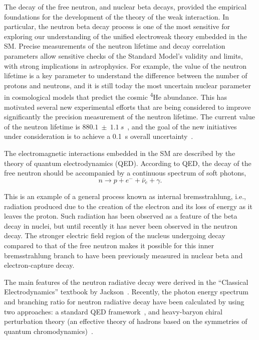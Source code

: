 \documentclass[oneside,12pt]{memoir}
\begin{document}
The decay of the free neutron, and nuclear beta decays, provided the empirical foundations for the development of the theory of the weak interaction. In particular, the neutron beta decay process is one of the most sensitive for exploring our understanding of the unified electroweak theory embedded in the SM. Precise measurements of the neutron lifetime and decay correlation parameters allow sensitive checks of the Standard Model's validity and limits, with strong implications in astrophysics. For example, the value of the neutron lifetime is a key parameter to understand the difference between the number of protons and neutrons, and it is still today the most uncertain nuclear parameter in cosmological models that predict the cosmic \textsuperscript{4}He abundance. This has motivated several new experimental efforts that are being considered to improve significantly the precision measurement of the neutron lifetime. The current value of the neutron lifetime is $880.1~\pm~1.1~s$~\cite{pdg}, and the goal of the new initiatives under consideration is to achieve a 0.1~s overall uncertainty~\cite{lifetime2012}.\par
The electromagnetic interactions embedded in the SM are described by the theory of quantum electrodynamics (QED). According to QED, the decay of the free neutron should be accompanied by a continuous spectrum of soft photons,
\begin{equation}
n\longrightarrow p + e^{-} + \bar{\nu}_{e} + \gamma.
\end{equation}\par
This is an example of a general process known as internal brem\-sstrah\-lung, i.e., radiation produced due to the creation of the electron and its loss of energy as it leaves the proton. Such radiation has been observed as a feature of the beta decay in nuclei, but until recently it has never been observed in the neutron decay. The stronger electric field region of the nucleus undergoing decay compared to that of the free neutron makes it possible for this inner bremsstrahlung branch to have been previously measured in nuclear beta and electron-capture decay. \par
The main features of the neutron radiative decay were derived in the ``Classical Electrodynamics'' textbook by Jackson~\cite{jackson99}. Recently, the photon energy spectrum and branching ratio for neutron radiative decay have been calculated by using two approaches: a standard QED framework~\cite{Gaponov96,Gaponov00}, and heavy-baryon chiral perturbation theory (an effective theory of hadrons based on the symmetries of quantum chromodynamics)~\cite{Bernard04,Bernard04er}.\par
\end{document}
